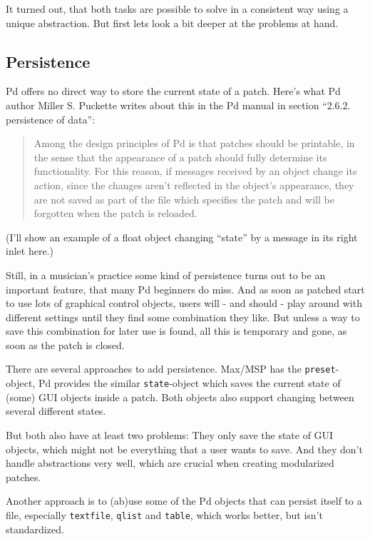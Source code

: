 \documentclass[10pt,english]{scrartcl}
\begin{document}
It turned out, that both tasks are possible to solve in a consistent way
using a unique abstraction. But first lets look a bit deeper at the
problems at hand.



\hypertarget{persistence}{}
\subsection*{Persistence}

Pd offers no direct way to store the current state of a patch. Here's what
Pd author Miller S. Puckette writes about this in the Pd manual in section
``2.6.2.  persistence of data'':
\begin{quote}

Among the design principles of Pd is that patches should be printable,
in the sense that the appearance of a patch should fully determine its
functionality. For this reason, if messages received by an object
change its action, since the changes aren't reflected in the object's
appearance, they are not saved as part of the file which specifies the
patch and will be forgotten when the patch is reloaded.
\end{quote}

(I'll show an example of a float object changing ``state'' by a message in
its right inlet here.)

Still, in a musician's practice some kind of persistence turns out to be an
important feature, that many Pd beginners do miss. And as soon as patched
start to use lots of graphical control objects, users will - and should -
play around with different settings until they find some combination they
like. But unless a way to save this combination for later use is found, all
this is temporary and gone, as soon as the patch is closed.

There are several approaches to add persistence. Max/MSP has the
\texttt{preset}-object, Pd provides the similar \texttt{state}-object which saves the
current state of (some) GUI objects inside a patch. Both objects also
support changing between several different states.

But both also have at least two problems: They only save the state of GUI
objects, which might not be everything that a user wants to save. And they
don't handle abstractions very well, which are crucial when creating
modularized patches.

Another approach is to (ab)use some of the Pd objects that can persist
itself to a file, especially \texttt{textfile}, \texttt{qlist} and \texttt{table}, which
works better, but isn't standardized.
\end{document}

